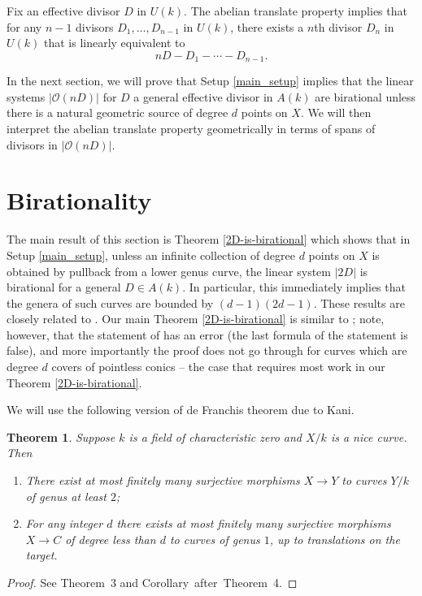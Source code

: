 \documentclass[11pt]{amsart}
\renewcommand{\O}{\mathcal{O}}
\newtheorem{theorem}{Theorem}[section]
\theoremstyle{definition}
\theoremstyle{remark}
\begin{document}
Fix an effective divisor $D$ in $U(k)$.  The abelian translate property implies that for any $n-1$ divisors $D_1, \dots, D_{n-1}$ in $U(k)$, there exists a $n$th divisor $D_n$ in $U(k)$ that is linearly equivalent to
\[nD - D_1 - \cdots - D_{n-1}.\]

In the next section, we will prove that Setup \ref{main_setup} implies that the linear systems \(|\O(nD)|\) for \(D\) a general effective divisor in \(A(k)\) are birational unless there is a natural geometric source of degree \(d\) points on \(X\).  We will then interpret the abelian translate property geometrically in terms of spans of divisors in \(|\O(nD)|\).

\section{Birationality}\label{sec:Birationality}
The main result of this section is Theorem \ref{2D-is-birational} which shows that in Setup \ref{main_setup}, unless an infinite collection of degree \(d\) points on \(X\) is obtained by pullback from a lower genus curve, the linear system $|2D|$ is birational for a general $D \in A(k)$. In particular, this immediately implies that the genera of such curves are bounded by \((d-1)(2d-1)\). These results are closely related to \cite{Abramovich-Harris1991}. Our main Theorem \ref{2D-is-birational} is  similar to \cite[Lemma 3]{Abramovich-Harris1991}; note, however, that the statement of \cite[Lemma 3]{Abramovich-Harris1991} has an error (the last formula of the statement is false), and more importantly the proof does not go through for curves which are degree $d$ covers of pointless conics -- the case that requires most work in our Theorem \ref{2D-is-birational}. 

We will use the following version of de Franchis theorem due to Kani.

\begin{theorem}\label{thm:kani}
Suppose $k$ is a field of characteristic zero and $X/k$ is a nice curve. Then
\begin{enumerate}
    \item There exist at most finitely many surjective morphisms $X \to Y$ to curves $Y/k$ of genus at least $2$;
    \item For any integer $d$ there exists at most finitely many surjective morphisms $X \to C$ of degree less than $d$ to curves of genus $1$, up to translations on the target.
\end{enumerate}
\end{theorem}
\begin{proof}
See \cite{Kani1986}{ Theorem~3} and \cite{Kani1986}{ Corollary~after~Theorem~4}.
\end{proof}
\end{document}
